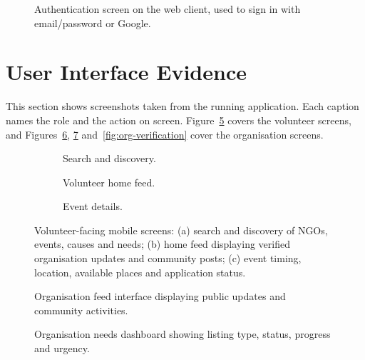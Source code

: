 \begin{figure}[H]
    \centering
    \caption{Authentication screen on the web client, used to sign in with email/password or Google.}
    \label{fig:navigation}
\end{figure}

\section{User Interface Evidence}
\label{sec:impl-ui}
This section shows screenshots taken from the running application. Each caption names the role and the action on screen. Figure~\ref{fig:ui-volunteer} covers the volunteer screens, and Figures~\ref{fig:organisation-feed}, \ref{fig:needs-management} and~\ref{fig:org-verification} cover the organisation screens.

\begin{figure}[H]
\centering
\begin{subfigure}[t]{0.31\textwidth}
  \centering
  \caption{Search and discovery.}
  \label{fig:search-discovery}
\end{subfigure}\hfill
\begin{subfigure}[t]{0.31\textwidth}
  \centering
  \caption{Volunteer home feed.}
  \label{fig:volunteer-home}
\end{subfigure}\hfill
\begin{subfigure}[t]{0.31\textwidth}
  \centering
  \caption{Event details.}
  \label{fig:event-details}
\end{subfigure}
\caption{Volunteer-facing mobile screens: (a) search and discovery of NGOs, events, causes and needs; (b) home feed displaying verified organisation updates and community posts; (c) event timing, location, available places and application status.}
\label{fig:ui-volunteer}
\end{figure}

\begin{figure}[H]
\centering
{}
\caption{Organisation feed interface displaying public updates and community activities.}
\label{fig:organisation-feed}
\end{figure}

\begin{figure}[H]
\centering
{}
\caption{Organisation needs dashboard showing listing type, status, progress and urgency.}
\label{fig:needs-management}
\end{figure}

